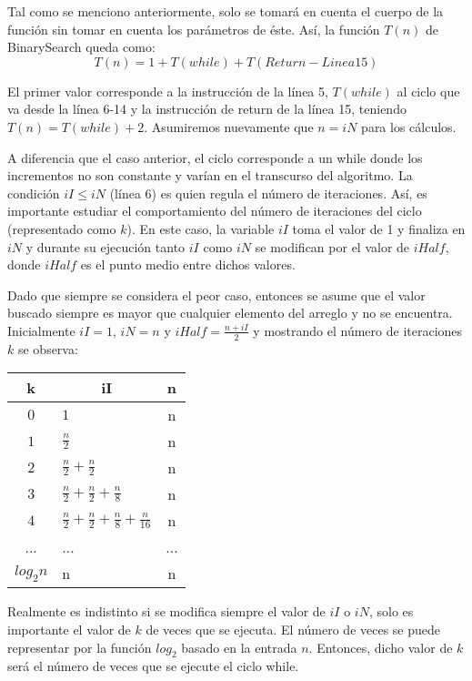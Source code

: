 Tal como se menciono anteriormente, solo se tomará en cuenta el cuerpo de la función sin tomar en cuenta los parámetros de éste. Así, la función $T(n)$ de BinarySearch queda como:
$$T(n) = 1 + T(while) + T(Return - Linea15)$$

El primer valor corresponde a la instrucción de la línea 5, $T(while)$ al ciclo que va desde la línea 6-14 y la instrucción de return de la línea 15, teniendo $T(n) = T(while) + 2$. Asumiremos nuevamente que $n = iN$ para los cálculos.

A diferencia que el caso anterior, el ciclo corresponde a un while donde los incrementos no son constante y varían en el transcurso del algoritmo. La condición $iI \le iN$ (línea 6) es quien regula el número de iteraciones. Así, es importante estudiar el comportamiento del número de iteraciones del ciclo (representado como $k$). En este caso, la variable $iI$ toma el valor de 1 y finaliza en $iN$ y durante su ejecución tanto $iI$ como $iN$ se modifican por el valor de $iHalf$, donde $iHalf$ es el punto medio entre dichos valores.

Dado que siempre se considera el peor caso, entonces se asume que el valor buscado siempre es mayor que cualquier elemento del arreglo y no se encuentra. Inicialmente $iI =1$, $iN = n$ y $iHalf = \frac{n+iI}{2}$ y mostrando el número de iteraciones $k$ se observa: 

\begin{table}[h]
\begin{tabular}{clc}
\hline
k    & \multicolumn{1}{c}{iI} & n                     \\ \hline
$0$    & $1$                      & n                     \\
$1$    & $\frac{n}{2}$                    & n                     \\
$2$    & $\frac{n}{2} + \frac{n}{2}$              & n                     \\
$3$    & $\frac{n}{2} + \frac{n}{2} + \frac{n}{8}$        & n                     \\
$4$    & $\frac{n}{2} + \frac{n}{2} + \frac{n}{8} + \frac{n}{16}$ & n \\
...  & ...                    & ...                   \\
$log_2n$ & n                      & n
\end{tabular}
\end{table}

Realmente es indistinto si se modifica siempre el valor de $iI$ o $iN$, solo es importante el valor de $k$ de veces que se ejecuta. El número de veces se puede representar por la función $log_2$ basado en la entrada $n$. Entonces, dicho valor de $k$ será el número de veces que se ejecute el ciclo while.

